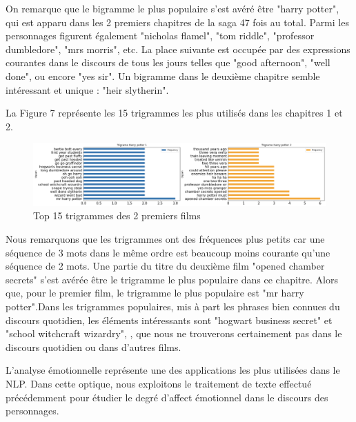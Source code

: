 \documentclass[11pt]{article}
\begin{document}
On remarque que le bigramme le plus populaire s'est avéré être "harry potter", qui est apparu dans les 2 premiers chapitres de la saga 47 fois au total. Parmi les personnages figurent également "nicholas flamel", "tom riddle", "professor dumbledore", "mrs morris", etc. La place suivante est occupée par des expressions courantes dans le discours de tous les jours telles que "good afternoon", "well done", ou encore "yes sir". Un bigramme dans le deuxième chapitre semble intéressant et unique : "heir slytherin".\par

La Figure 7 représente les 15 trigrammes les plus utilisés dans les chapitres 1 et 2.

\begin{figure}[hbt!]
    \includegraphics[width= 16cm, height= 7 cm]{./figures/trigrams.png}
    \caption{Top 15 trigrammes des 2 premiers films}
\end{figure}
\FloatBarrier

Nous remarquons que les trigrammes ont des fréquences plus petits car une séquence de 3 mots dans le même ordre est beaucoup moins courante qu'une séquence de 2 mots. Une partie du titre du deuxième film "opened chamber secrets" s'est avérée être le trigramme le plus populaire dans ce chapitre. Alors que, pour le premier film, le trigramme le plus populaire est "mr harry potter".Dans les trigrammes populaires, mis à part les phrases bien connues du discours quotidien, les éléments intéressants sont "hogwart business secret" et "school witchcraft wizardry", , que nous ne trouverons certainement pas dans le discours quotidien ou dans d'autres films.\par

L'analyse émotionnelle représente une des applications les plus utilisées dans le NLP. Dans cette optique, nous exploitons le traitement de texte effectué précédemment pour étudier le degré d'affect émotionnel dans le discours des personnages.\par
\end{document}
